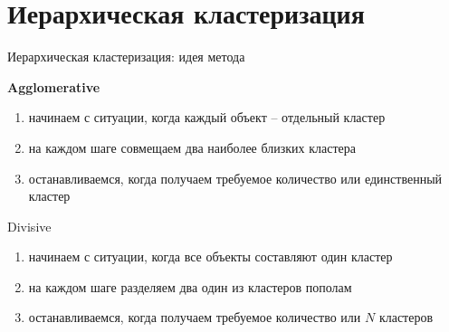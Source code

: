 \documentclass[10pt]{beamer}
\begin{document}

\section{Иерархическая кластеризация}


\begin{frame}{Иерархическая кластеризация: идея метода}

{\bf Agglomerative}
\begin{enumerate}
\item начинаем с ситуации, когда каждый объект -- отдельный кластер
\item на каждом шаге совмещаем два наиболее близких кластера
\item останавливаемся, когда получаем требуемое количество или единственный кластер
\end{enumerate}

\vspace{1em}
Divisive
\begin{enumerate}
\item начинаем с ситуации, когда все объекты составляют один кластер
\item на каждом шаге разделяем два один из кластеров пополам
\item останавливаемся, когда получаем требуемое количество или $N$ кластеров
\end{enumerate}

\end{frame}
\end{document}
